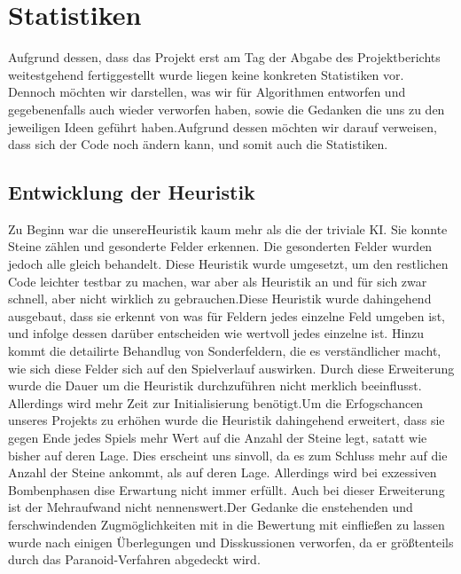 \documentclass[12pt,a4paper]{article}
\begin{document}
\section{Statistiken}
Aufgrund dessen, dass das Projekt erst am Tag der Abgabe des Projektberichts weitestgehend fertiggestellt wurde liegen keine konkreten Statistiken vor. Dennoch möchten wir darstellen, was wir für Algorithmen entworfen und gegebenenfalls auch wieder verworfen haben, sowie die Gedanken die uns zu den jeweiligen Ideen geführt haben.\newline Aufgrund dessen möchten wir darauf verweisen, dass sich der Code noch ändern kann, und somit auch die Statistiken.

\subsection{Entwicklung der Heuristik}
Zu Beginn war die unsereHeuristik kaum mehr als die der triviale KI. Sie konnte Steine zählen und gesonderte Felder erkennen. Die gesonderten Felder wurden jedoch alle gleich behandelt. Diese Heuristik wurde umgesetzt, um den restlichen Code leichter testbar zu machen, war aber als Heuristik an und für sich zwar schnell, aber nicht wirklich zu gebrauchen.\newline Diese Heuristik wurde dahingehend ausgebaut, dass sie erkennt von was für Feldern jedes einzelne Feld umgeben ist, und infolge dessen darüber entscheiden wie wertvoll jedes einzelne ist. Hinzu kommt die detailirte Behandlug von Sonderfeldern, die es verständlicher macht, wie sich diese Felder sich auf den Spielverlauf auswirken. Durch diese Erweiterung wurde die Dauer um die Heuristik durchzuführen nicht merklich beeinflusst. Allerdings wird mehr Zeit zur Initialisierung benötigt.\newline Um die Erfogschancen unseres Projekts zu erhöhen wurde die Heuristik dahingehend erweitert, dass sie gegen Ende jedes Spiels mehr Wert auf die Anzahl der Steine legt, satatt wie bisher auf deren Lage. Dies erscheint uns sinvoll, da es zum Schluss mehr auf die Anzahl der Steine ankommt, als auf deren Lage. Allerdings wird bei exzessiven Bombenphasen dise Erwartung nicht immer erfüllt. Auch bei dieser Erweiterung ist der Mehraufwand nicht nennenswert.\newline Der Gedanke die enstehenden und ferschwindenden Zugmöglichkeiten mit in die Bewertung mit einfließen zu lassen wurde nach einigen Überlegungen und Disskussionen verworfen, da er größtenteils durch das Paranoid-Verfahren abgedeckt wird.
\end{document}
